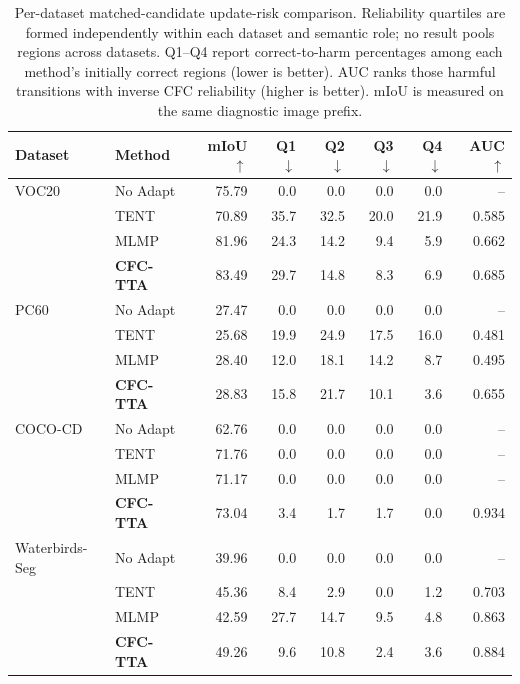 \begin{table}[t]
\centering
\small
\setlength{\tabcolsep}{4.5pt}
\caption{Per-dataset matched-candidate update-risk comparison. Reliability quartiles are formed independently within each dataset and semantic role; no result pools regions across datasets. Q1--Q4 report correct-to-harm percentages among each method's initially correct regions (lower is better). AUC ranks those harmful transitions with inverse CFC reliability (higher is better). mIoU is measured on the same diagnostic image prefix.}
\label{tab:source-risk-per-dataset}
\begin{tabular}{llrrrrrr}
\toprule
Dataset & Method & mIoU $\uparrow$ & Q1 $\downarrow$ & Q2 $\downarrow$ & Q3 $\downarrow$ & Q4 $\downarrow$ & AUC $\uparrow$ \\
\midrule
VOC20 & No Adapt & 75.79 & 0.0 & 0.0 & 0.0 & 0.0 & -- \\
 & TENT & 70.89 & 35.7 & 32.5 & 20.0 & 21.9 & 0.585 \\
 & MLMP & 81.96 & 24.3 & 14.2 & 9.4 & 5.9 & 0.662 \\
 & \textbf{CFC-TTA} & 83.49 & 29.7 & 14.8 & 8.3 & 6.9 & 0.685 \\
\midrule
PC60 & No Adapt & 27.47 & 0.0 & 0.0 & 0.0 & 0.0 & -- \\
 & TENT & 25.68 & 19.9 & 24.9 & 17.5 & 16.0 & 0.481 \\
 & MLMP & 28.40 & 12.0 & 18.1 & 14.2 & 8.7 & 0.495 \\
 & \textbf{CFC-TTA} & 28.83 & 15.8 & 21.7 & 10.1 & 3.6 & 0.655 \\
\midrule
COCO-CD & No Adapt & 62.76 & 0.0 & 0.0 & 0.0 & 0.0 & -- \\
 & TENT & 71.76 & 0.0 & 0.0 & 0.0 & 0.0 & -- \\
 & MLMP & 71.17 & 0.0 & 0.0 & 0.0 & 0.0 & -- \\
 & \textbf{CFC-TTA} & 73.04 & 3.4 & 1.7 & 1.7 & 0.0 & 0.934 \\
\midrule
Waterbirds-Seg & No Adapt & 39.96 & 0.0 & 0.0 & 0.0 & 0.0 & -- \\
 & TENT & 45.36 & 8.4 & 2.9 & 0.0 & 1.2 & 0.703 \\
 & MLMP & 42.59 & 27.7 & 14.7 & 9.5 & 4.8 & 0.863 \\
 & \textbf{CFC-TTA} & 49.26 & 9.6 & 10.8 & 2.4 & 3.6 & 0.884 \\
\bottomrule
\end{tabular}
\end{table}

